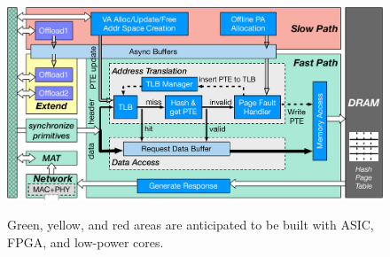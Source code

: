 {
\begin{figure}[t]
\begin{center}
\centerline{\includegraphics[width=\columnwidth]{Figures/CoreMem.pdf}}
{
Green, yellow, and red areas are anticipated to be built with 
ASIC, FPGA, and low-power cores.
}
\end{center}
\end{figure}
}
